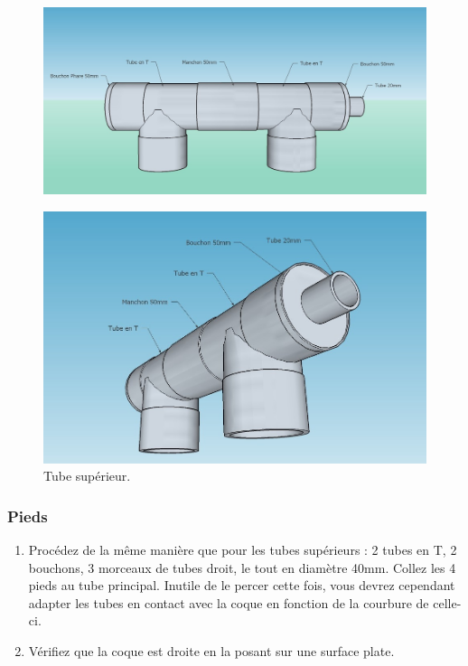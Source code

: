 \documentclass[11pt,a4paper]{article}
\begin{document}
          \begin{figure}[H]
            \centering
            \includegraphics[scale=0.35]{ROVTubeSuperieur.jpg}
          \end{figure}
          \begin{figure}[H]
            \centering
            \includegraphics[scale=0.4]{ROVTubeSuperieurArriere.jpg}
            \caption{Tube supérieur.}
          \end{figure}
          
        \subsubsection{Pieds}
          \begin{enumerate}
            \item Procédez de la même manière que pour les tubes supérieurs : 2 tubes en T, 2 bouchons, 3 morceaux de tubes droit, le tout en diamètre 40mm. Collez les 4 pieds au tube principal. Inutile de le percer cette fois, vous devrez cependant adapter les tubes en contact avec la coque en fonction de la courbure de celle-ci.
            
            \item Vérifiez que la coque est droite en la posant sur une surface plate.
        \end{enumerate}
        
\end{document}
